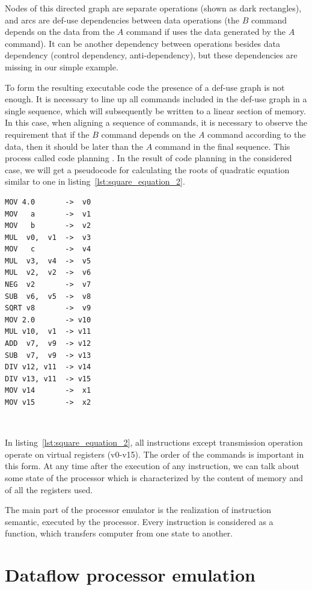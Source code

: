 \documentclass[
11pt,%
tightenlines,%
twoside,%
onecolumn,%
nofloats,%
nobibnotes,%
nofootinbib,%
superscriptaddress,%
noshowpacs,%
centertags]%
{revtex4}
\begin{document}
Nodes of this directed graph are separate operations (shown as dark rectangles), and arcs are def-use dependencies between data operations (the $B$ command depends on the data from the $A$ command if uses the data generated by the $A$ command).
It can be another dependency between operations besides data dependency (control dependency, anti-dependency), but these dependencies are missing in our simple example.

To form the resulting executable code the presence of a def-use graph is not enough.
It is necessary to line up all commands included in the def-use graph in a single sequence, which will subsequently be written to a linear section of memory.
In this case, when aligning a sequence of commands, it is necessary to observe the requirement that if the $B$ command depends on the $A$ command according to the data, then it should be later than the $A$ command in the final sequence.
This process called code planning \cite{Aho}.
In the result of code planning in the considered case, we will get a pseudocode for calculating the roots of quadratic equation similar to one in listing~\ref{lst:square_equation_2}.

\begin{lstlisting}[caption={Pseudocode for calculating the roots of  quadratic equation.},label={lst:square_equation_2}]
MOV 4.0       ->  v0
MOV   a       ->  v1
MOV   b       ->  v2
MUL  v0,  v1  ->  v3
MOV   c       ->  v4
MUL  v3,  v4  ->  v5
MUL  v2,  v2  ->  v6
NEG  v2       ->  v7
SUB  v6,  v5  ->  v8
SQRT v8       ->  v9
MOV 2.0       -> v10
MUL v10,  v1  -> v11
ADD  v7,  v9  -> v12
SUB  v7,  v9  -> v13
DIV v12, v11  -> v14
DIV v13, v11  -> v15
MOV v14       ->  x1
MOV v15       ->  x2
\end{lstlisting}

\

In listing~\ref{lst:square_equation_2}, all instructions except transmission operation operate on virtual registers (v0-v15).
The order of the commands is important in this form.
At any time after the execution of any instruction, we can talk about some state of the processor which is characterized by the content of memory and of all the registers used.

The main part of the processor emulator is the realization of instruction semantic, executed by the processor.
Every instruction is considered as a function, which transfers computer from one state to another.

\section{Dataflow processor emulation}
\end{document}
